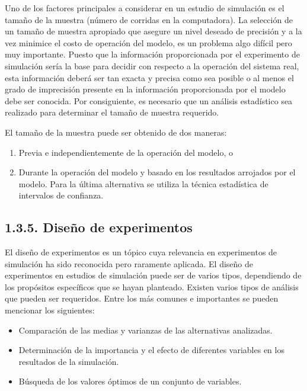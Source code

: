 \documentclass[11pt,letterpaper]{report}
\begin{document}
Uno de los factores principales a considerar en un estudio de simulación
es el tamaño de la muestra (número de corridas en la computadora). La
selección de un tamaño de muestra apropiado que asegure un nivel deseado
de precisión y a la vez minimice el costo de operación del modelo, es un
problema algo difícil pero muy importante. Puesto que la información
proporcionada por el experimento de simulación sería la base para
decidir con respecto a la operación del sistema real, esta información
deberá ser tan exacta y precisa como sea posible o al menos el grado de
imprecisión presente en la información proporcionada por el modelo debe
ser conocida. Por consiguiente, es necesario que un análisis estadístico
sea realizado para determinar el tamaño de muestra requerido.

El tamaño de la muestra puede ser obtenido de dos maneras:

\begin{enumerate}
\item Previa e independientemente de la operación del modelo, o
\item Durante la operación del modelo y basado en los resultados
arrojados por el modelo. Para la última alternativa se utiliza la
técnica estadística de intervalos de confianza.
\end{enumerate}

\subsection*{1.3.5. Diseño de experimentos}

El diseño de experimentos es un tópico cuya relevancia en experimentos
de simulación ha sido reconocida pero raramente aplicada. El diseño de
experimentos en estudios de simulación puede ser de varios tipos,
dependiendo de los propósitos específicos que se hayan planteado.
Existen varios tipos de análisis que pueden ser requeridos. Entre los
más comunes e importantes se pueden mencionar los siguientes:

\begin{itemize}[leftmargin=*]
\item Comparación de las medias y varianzas de las alternativas
analizadas.
\item Determinación de la importancia y el efecto de diferentes
variables en los resultados de la simulación.
\item Búsqueda de los valores óptimos de un conjunto de variables.
\end{itemize}
\end{document}
